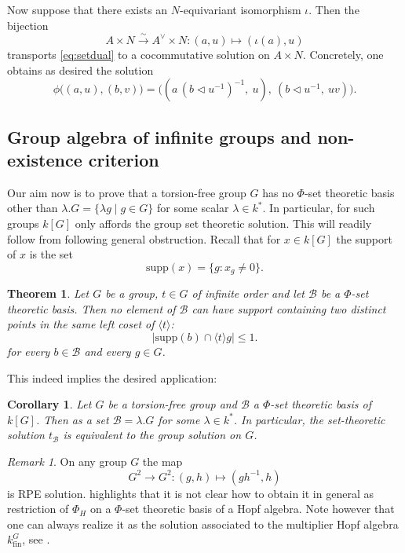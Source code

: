 \documentclass[a4paper,10pt]{amsart}
\newtheorem{theorem}[lemma]{Theorem}
\newtheorem{corollary}[lemma]{Corollary}
\theoremstyle{definition}
\theoremstyle{remark}
\newtheorem{remark}[lemma]{Remark}
\newcommand{\Supp}{\mathrm{supp}}
\newcommand{\fin}{\operatorname{fin}}
\newcommand\mc{\mathcal}
\begin{document}
Now suppose that there exists an $N$-equivariant isomorphism $\iota$.
Then the bijection
\[
A\times N \xrightarrow{\sim} A^\vee\times N : (a,u)\mapsto (\iota(a),u)
\]
transports \eqref{eq:setdual} to a cocommutative solution on $A\times N$.
Concretely, one obtains as desired the solution
\[
\phi\bigl((a,u),(b,v)\bigr)
=
\bigl((a\,(b\triangleleft u^{-1})^{-1},\ u),\ (b\triangleleft u^{-1},\ uv)\bigr).
\]

\subsection{Group algebra of infinite groups and non-existence criterion}\label{exotic basis for infinite groups}
Our aim now is to prove that a torsion-free group $G$ has no $\Phi$-set theoretic basis other than $\lambda.G= \{ \lambda g \mid g \in G\}$ for some scalar $\lambda \in k^*$. In particular, for such groups $k[G]$ only affords the group set theoretic solution. This will readily follow from following general obstruction. Recall that for $x\in k[G]$ the support of $x$ is the set
$$\Supp(x)=\{g:x_g\neq 0\}.$$


\begin{theorem}\label{thm:two-point-obstruction}
Let $G$ be a group, $t\in G$ of infinite order and let $\mc{B}$ be a $\Phi$-set theoretic basis. Then no element of $\mc{B}$ can have support containing two distinct points in the same left coset of $\langle t\rangle$:
\[
\bigl|\Supp(b)\cap \langle t\rangle g\bigr|\le 1.
\]
for every $b\in \mc{B}$ and every $g\in G$.

\end{theorem}

This indeed implies the desired application:

\begin{corollary}\label{no non-triv sol of torsion-fre}
Let $G$ be a torsion-free group and $\mc{B}$ a $\Phi$-set theoretic basis of $k[G]$. Then as a set $\mc{B} = \lambda. G$ for some $\lambda \in k^*$. In particular, the set-theoretic solution $t_{\mc{B}}$ is equivalent to the group solution on $G$.
\end{corollary}


\begin{remark}
On any group $G$ the map 
$$G^2 \rightarrow G^2: (g,h) \mapsto (gh^{-1},h)$$
is RPE solution.  highlights that it is not clear how to obtain it in general as restriction of $\Phi_H$ on a $\Phi$-set theoretic basis of a Hopf algebra. Note however that one can always realize it as the solution associated to the multiplier Hopf algebra $k^{G}_{\fin}$, see .
\end{remark}
\end{document}
